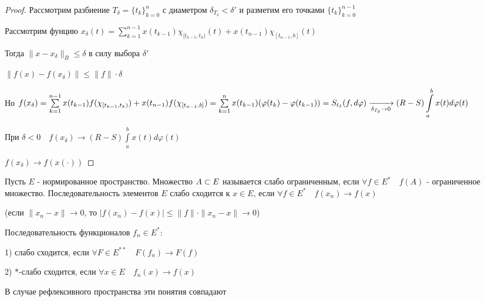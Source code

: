 \documentclass[a4paper,12pt]{report}
\newcommand*{\hm}[1]{#1\nobreak\discretionary{}%
            {\hbox{$\mathsurround=0pt #1$}}{}}
\begin{document}
\begin{proof}
Рассмотрим разбиение $T_\delta=\{t_k\}_{k=0}^n$ с диаметром $\delta_{T_\delta}<\delta'$ и разметим его точками $\{t_k\}_{k=0}^{n-1}$

Рассмотрим фунцию $x_\delta(t)=\sum\limits_{k=1}^{n-1}x(t_{k-1})\chi_{[t_{k-1},t_k)}(t)+x(t_{n-1})\chi_{[t_{n-1},b]}(t)$

Тогда $\|x-x_\delta\|_B\le\delta$ в силу выбора $\delta'$

$\|f(x)-f(x_\delta)\|\le\|f\|\cdot\delta$

Но $f(x_\delta)=\sum\limits_{k=1}^{n-1}x(t_{k-1})f(\chi_{[t_{k-1},t_k)})+x(t_{n-1})f(\chi_{[t_{n-1},b]})=\sum\limits_{k=1}^nx(t_{k-1})(\varphi(t_k)\hm-\varphi(t_{k-1}))=S_{t_\delta}(f,d\varphi)\xrightarrow[\delta_{T_\delta}\to0]{}(R-S)\displaystyle\int\limits_a^b x(t)d\varphi(t)$

При $\delta<0\quad f(x_\delta)\to(R-S)\displaystyle\int\limits_a^b x(t)d\varphi(t)$

$f(x_\delta)\to f(x(\cdot))$
\end{proof}
 


\begin{df}
Пусть $E$ - нормированное пространство. Множество $A\hm\subset E$ называется слабо ограниченным, если $\forall f\in E^*\quad f(A)$ - ограниченное множество. Последовательность элементов $E$ слабо сходится к $x\in E$, если $\forall f\in E^*\quad f(x_n)\to f(x)$ 

(если $\|x_n-x\|\to0$, то $|f(x_n)-f(x)|\le\|f\|\cdot\|x_n-x\|\to0$)
\end{df}
 


\begin{df}
Последовательность функционалов $f_n\in E^*$:

1) слабо сходится, если $\forall F\in E^{**}\quad F(f_n)\to F(f)$

2) $*$-слабо сходится, если $\forall x\in E\quad f_n(x)\to f(x)$
\end{df}
 


\begin{rem}
В случае рефлексивного пространства эти понятия совпадают
\end{rem}
 
\end{document}
